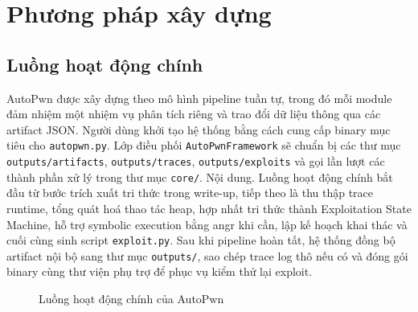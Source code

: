 \documentclass[final]{hcmuitthesis}
\begin{document}
\section{Phương pháp xây dựng}
\subsection{Luồng hoạt động chính}
AutoPwn được xây dựng theo mô hình pipeline tuần tự, trong đó mỗi module đảm nhiệm một nhiệm vụ phân tích riêng và trao đổi dữ liệu thông qua các artifact JSON. Người dùng khởi tạo hệ thống bằng cách cung cấp binary mục tiêu cho \texttt{autopwn.py}. Lớp điều phối \texttt{AutoPwnFramework} sẽ chuẩn bị các thư mục \texttt{outputs/artifacts}, \texttt{outputs/traces}, \texttt{outputs/exploits} và gọi lần lượt các thành phần xử lý trong thư mục \texttt{core/}.
Nội dung.
Luồng hoạt động chính bắt đầu từ bước trích xuất tri thức trong write-up, tiếp theo là thu thập trace runtime, tổng quát hoá thao tác heap, hợp nhất tri thức thành Exploitation State Machine, hỗ trợ symbolic execution bằng angr khi cần, lập kế hoạch khai thác và cuối cùng sinh script \texttt{exploit.py}. Sau khi pipeline hoàn tất, hệ thống đồng bộ artifact nội bộ sang thư mục \texttt{outputs/}, sao chép trace log thô nếu có và đóng gói binary cùng thư viện phụ trợ để phục vụ kiểm thử lại exploit.
\begin{figure}[H]
    \centering
    \caption{Luồng hoạt động chính của AutoPwn}
\end{figure}
\end{document}
